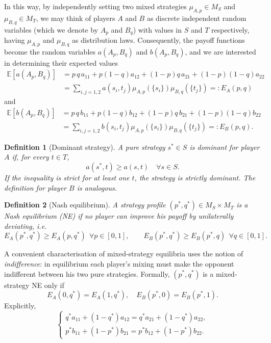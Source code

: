 \documentclass[11pt,a4paper,twoside]{article}
\newcommand{\EE}[1]{\mathbb E\left[#1\right]}
\newtheorem{definition}{Definition}
\begin{document}
In this way, by independently setting two mixed strategies $\mu_{A,p}\in M_S$ and $\mu_{B,q}\in M_T$, we may think of players $A$ and $B$ as discrete independent random variables (which we denote by $A_p$ and $B_q$) with values in $S$ and $T$ respectively, having $\mu_{A,p}$ and $\mu_{B,q}$ as distribution laws. Consequently, the payoff functions become the random variables $a(A_p,B_q)$ and $b(A_p,B_q)$, and we are interested in determining their expected values
\begin{align*}
\EE{a(A_p,B_q)}&= p\,q\,a_{11} + p(1-q)a_{12} + (1-p)q\,a_{21} + (1-p)(1-q)a_{22}\\
&=\sum_{i,j=1,2}a(s_i,t_j)\mu_{A,p}(\{s_i\})\mu_{B,q}(\{t_j\})=:E_A(p,q)
\end{align*}
and 
\begin{align*}
\EE{b(A_p,B_q)}&=p\,q\,b_{11} + p(1-q)b_{12} + (1-p)q\,b_{21} + (1-p)(1-q)b_{22}\\
&=\sum_{i,j=1,2}b(s_i,t_j)\mu_{A,p}(\{s_i\})\mu_{B,q}(\{t_j\})=:E_B(p,q).
\end{align*}





\begin{definition}[Dominant strategy]
A pure strategy \(s^*\in S\) is \emph{dominant} for player \(A\) if, for every \(t\in T\),
\[
a(s^*,t)\ge a(s,t)\quad\forall s\in S.
\]
If the inequality is strict for at least one \(t\), the strategy is \emph{strictly dominant}.  
The definition for player \(B\) is analogous.
\end{definition}

\begin{definition}[Nash equilibrium]
A strategy profile $(p^*,q^*)\in M_S\times M_T$ is a \emph{Nash equilibrium} (NE) if no player can improve his payoff by unilaterally deviating, i.e.
\[
E_A(p^*,q^*)\ge E_A(p,q^*)\ \ \forall p\in[0,1],\qquad 
E_B(p^*,q^*)\ge E_B(p^*,q)\ \ \forall q\in[0,1].
\]
\end{definition}



A convenient characterisation of mixed-strategy equilibria uses the notion of \emph{indifference}:  
in equilibrium each player's mixing must make the opponent indifferent between his two pure strategies.  
Formally, \((p^*,q^*)\) is a mixed-strategy NE only if
\[
E_A(0,q^*)=E_A(1,q^*),\quad 
E_B(p^*,0)=E_B(p^*,1).
\]  
Explicitly,
\[
\left\{\begin{array}{l}q^*a_{11}+(1-q^*)a_{12}=q^*a_{21}+(1-q^*)a_{22},\\
p^*b_{11}+(1-p^*)b_{21}=p^*b_{12}+(1-p^*)b_{22}.
\end{array}\right.
\]
\end{document}
